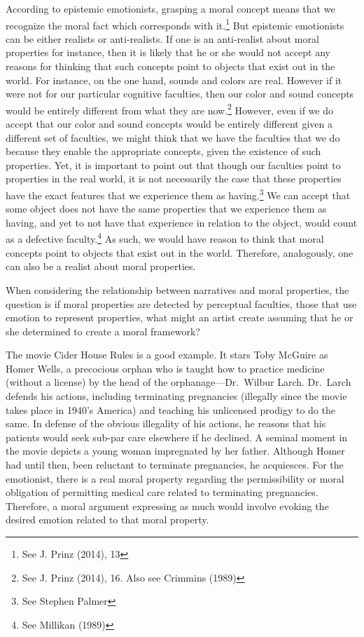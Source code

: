 \documentclass[12pt]{book}
\theoremstyle{definition}
\theoremstyle{remark}
\begin{document}
According to epistemic emotionists, grasping a moral concept means that we recognize the moral fact which corresponds with it.\footnote{See J. Prinz (2014), 13} But epistemic emotionists can be either realists or anti-realists. If one is an anti-realist about moral properties for instance, then it is likely that he or she would not accept any reasons for thinking that such concepts point to objects that exist out in the world. For instance, on the one hand, sounds and colors are real. However if it were not for our particular cognitive faculties, then our color and sound concepts would be entirely different from what they are now.\footnote{See J. Prinz (2014), 16. Also see Crimmins (1989)} However, even if we do accept that our color and sound concepts would be entirely different given a different set of faculties, we might think that we have the faculties that we do because they enable the appropriate concepts, given the existence of such properties. Yet, it is important to point out that though our faculties point to properties in the real world, it is not necessarily the case that these properties have the exact features that we experience them as having.\footnote{See Stephen Palmer} We can accept that some object does not have the same properties that we experience them as having, and yet to not have that experience in relation to the object, would count as a defective faculty.\footnote{See Millikan (1989)} As such, we would have reason to think that moral concepts point to objects that exist out in the world. Therefore, analogously, one can also be a realist about moral properties.

When considering the relationship between narratives and moral properties, the question is if moral properties are detected by perceptual faculties, those that use emotion to represent properties, what might an artist create assuming that he or she determined to create a moral framework?

The movie Cider House Rules is a good example. It stars Toby McGuire as Homer Wells, a precocious orphan who is taught how to practice medicine (without a license) by the head of the orphanage---Dr.~Wilbur Larch. Dr.~Larch defends his actions, including terminating pregnancies (illegally since the movie takes place in 1940's America) and teaching his unlicensed prodigy to do the same. In defense of the obvious illegality of his actions, he reasons that his patients would seek sub-par care elsewhere if he declined. A seminal moment in the movie depicts a young woman impregnated by her father. Although Homer had until then, been reluctant to terminate pregnancies, he acquiesces. For the emotionist, there is a real moral property regarding the permissibility or moral obligation of permitting medical care related to terminating pregnancies. Therefore, a moral argument expressing as much would involve evoking the desired emotion related to that moral property.
\end{document}
